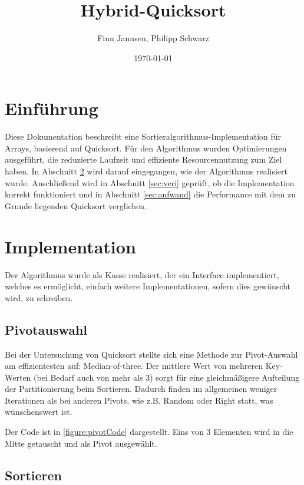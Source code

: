 \documentclass[11pt]{scrartcl}
\title{Hybrid-Quicksort}
\author{Finn Jannsen, Philipp Schwarz}
\date{\today{}}
\begin{document}
\maketitle

\tableofcontents

\section{Einführung}
	\label{sec:einfuehrung}
	
	Diese Dokumentation beschreibt eine Sortieralgorithmus-Implementation für Arrays, basierend auf Quicksort.
	Für den Algorithmus wurden Optimierungen ausgeführt, die reduzierte Laufzeit und effiziente Resourcennutzung zum Ziel haben.
	In Abschnitt \ref{sec:implementation} wird darauf eingegangen, wie der Algorithmus realisiert wurde.
	Anschließend wird in Abschnitt \ref{sec:veri} geprüft, ob die Implementation korrekt funktioniert 
	und in Abschnitt \ref{sec:aufwand} die Performance mit dem zu Grunde liegenden Quicksort verglichen.

\section{Implementation}
	\label{sec:implementation}
	
	Der Algorithmus wurde als Kasse realisiert, der ein Interface implementiert, welches es ermöglicht, einfach weitere Implementationen, sofern dies gewünscht wird, zu schreiben.

	\subsection{Pivotauswahl}
		\label{sec:pivAus}
		
		Bei der Untersuchung von Quicksort stellte sich eine Methode zur Pivot-Auswahl am effizientesten auf: Median-of-three.
		Der mittlere Wert von mehreren Key-Werten (bei Bedarf auch von mehr als 3) sorgt für eine gleichmäßigere Aufteilung der Partitionierung beim Sortieren.
		Dadurch finden im allgemeinen weniger Iterationen als bei anderen Pivots, wie z.B. Random oder Right statt, was wünschenswert ist.
 
		Der Code ist in \ref{figure:pivotCode} dargestellt. Eins von 3 Elementen wird in die Mitte getauscht und als Pivot ausgewählt.
	
	\subsection{Sortieren}
		\label{sec:sortAlgo}
		
\end{document}
